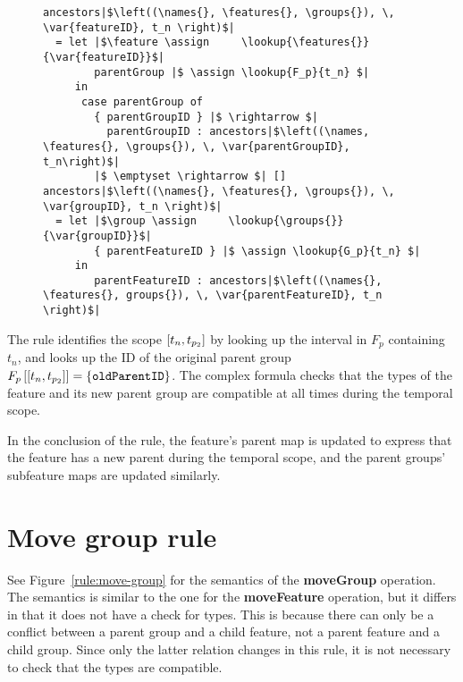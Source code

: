 \begin{figure}[h]
  \begin{verbatim}
ancestors|$\left((\names{}, \features{}, \groups{}), \, \var{featureID}, t_n \right)$| 
  = let |$\feature \assign     \lookup{\features{}}{\var{featureID}}$|
        parentGroup |$ \assign \lookup{F_p}{t_n} $|
     in 
      case parentGroup of
        { parentGroupID } |$ \rightarrow $| 
          parentGroupID : ancestors|$\left((\names, \features{}, \groups{}), \, \var{parentGroupID}, t_n\right)$|
        |$ \emptyset \rightarrow $| []
ancestors|$\left((\names{}, \features{}, \groups{}), \, \var{groupID}, t_n \right)$| 
  = let |$\group \assign     \lookup{\groups{}}{\var{groupID}}$|
        { parentFeatureID } |$ \assign \lookup{G_p}{t_n} $|
     in 
        parentFeatureID : ancestors|$\left((\names{}, \features{}, groups{}), \, \var{parentFeatureID}, t_n \right)$| 
  \end{verbatim}
  \caption{}
  \label{fun:ancestors}
\end{figure}

The rule identifies the scope $\interval{t_n}{t_{p_2}}$ by looking up the interval in $F_p$ containing $t_n$, and looks up the ID of the original parent group $\lookup{F_p}{\interval{t_n}{t_{p_2}}} = \set{\var{oldParentID}}$. The complex formula checks that the types of the feature and its new parent group are compatible at all times during the temporal scope.

In the conclusion of the rule, the feature's parent map is updated to express that the feature has a new parent during the temporal scope, and the parent groups' subfeature maps are updated similarly.

\section{Move group rule}
\label{sec:move-group-rule}
See Figure~\vref{rule:move-group} for the semantics of the \textbf{moveGroup} operation. The semantics is similar to the one for the \textbf{moveFeature} operation, but it differs in that it does not have a check for types. This is because there can only be a conflict between a parent group and a child feature, not a parent feature and a child group. Since only the latter relation changes in this rule, it is not necessary to check that the types are compatible.

